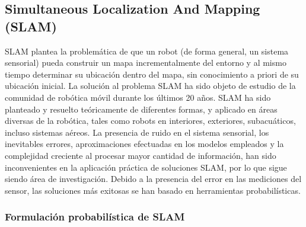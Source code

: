 \subsection{Simultaneous Localization And Mapping (SLAM)}

SLAM plantea la problemática de que un robot (de forma general, un sistema sensorial) pueda construir un mapa incrementalmente del entorno y al mismo tiempo determinar su ubicación dentro del mapa, sin conocimiento a priori de su ubicación inicial. La solución al problema SLAM ha sido objeto de estudio de la comunidad de robótica móvil durante los últimos 20 años. SLAM ha sido planteado y resuelto teóricamente de diferentes formas, y aplicado en áreas diversas de la robótica, tales como robots en interiores, exteriores, subacuáticos, incluso sistemas aéreos. La presencia de ruido en el sistema sensorial, los inevitables errores, aproximaciones efectuadas en los modelos empleados y la complejidad creciente al procesar mayor cantidad de información, han sido inconvenientes en la aplicación práctica de soluciones SLAM, por lo que sigue siendo área de investigación. Debido a la presencia del error en las mediciones del sensor, las soluciones más exitosas se han basado en herramientas probabilísticas.

\subsubsection{Formulación probabilística de SLAM}

